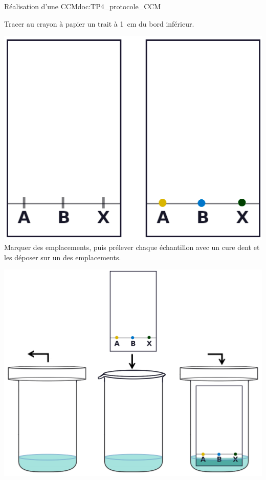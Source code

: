 \begin{doc}{Réalisation d'une CCM}{doc:TP4_protocole_CCM}
\begin{multicols}{3}
\begin{center}
      Tracer au crayon à papier un trait à \qty{1}{\cm} du bord inférieur.
    \end{center}
  
    \begin{center}
      \includegraphics[height=0.15\textheight]{images/chimie/CCM/CCM_etapes_depot.png}
      Marquer des emplacements,
      puis prélever chaque échantillon avec un cure dent et les déposer sur un des emplacements.
    \end{center}
  \end{multicols}
  
  \bigskip
  
  \begin{multicols}{2}
    \begin{center}
      \includegraphics[height=0.25\textheight]{images/chimie/CCM/CCM_etapes_ajout.png}
      

\end{center}
\end{multicols}
\end{doc}
